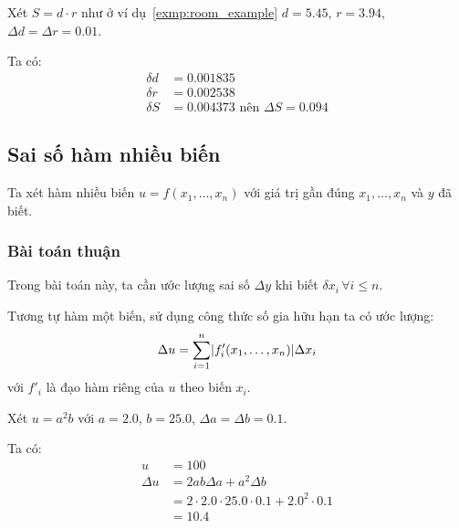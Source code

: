 \documentclass[../../Lectures.tex]{subfiles}
\begin{document}
\begin{exmp}
    Xét \(S = d \cdot r\) như ở ví dụ~\ref{exmp:room_example} \(d =
    \num{5.45}\), \(r = \num{3.94}\), \(\Delta d = \Delta r = \num{0.01}\).

    Ta có:
    \[\begin{aligned}
        \delta d &= \num{0.001835} \\
        \delta r &= \num{0.002538} \\
        \delta S &= \num{0.004373} \text{ nên } \Delta S = \num{0.094}
    \end{aligned}\]
\end{exmp}

\subsection{Sai số hàm nhiều biến}

Ta xét hàm nhiều biến \(u = f(x_1, \ldots, x_n)\) với giá trị gần đúng \(x_1,
\ldots, x_n\) và \(y\) đã biết.

\subsubsection{Bài toán thuận}

Trong bài toán này, ta cần ước lượng sai số \(\Delta y\) khi biết \(\delta x_i
\, \forall i \leq n\).    %

Tương tự hàm một biến, sử dụng công thức số gia hữu hạn ta có ước lượng:
\begin{equation} \label{eq:absolute_error_of_function}
    \Delta u = \sum_{i=1}^{n} \lvert f'_i(x_1, \ldots, x_n)\rvert \Delta x_i
\end{equation}
với \(f'_i\) là đạo hàm riêng của \(u\) theo biến \(x_i\).

\begin{exmp}
    Xét \(u = a^2 b\) với \(a = \num{2.0}\), \(b = \num{25.0}\), \(\Delta a =
    \Delta b = \num{0.1}\).

    Ta có:
    \[\begin{aligned}
               u &= 100 \\
        \Delta u &= 2ab \Delta a + a^2 \Delta b \\
                 &= 2 \cdot \num{2.0} \cdot \num{25.0} \cdot \num{0.1} + \num{2.0}^2 \cdot \num{0.1} \\
                 &= \num{10.4}
    \end{aligned}\]
\end{exmp}
\end{document}
